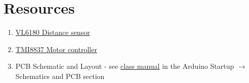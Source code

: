 \section{Resources}\label{sec:distmotorservoresources}
\begin{enumerate}
    \item \href{https://www.st.com/resource/en/datasheet/vl6180.pdf}{VL6180 Distance sensor}
    \item \href{https://datasheet.lcsc.com/lcsc/2001060933_TMI-TMI8837_C478955.pdf}{TMI8837 Motor controller}
    \item PCB Schematic and Layout - see 
            \href{https://github.com/semcneil/Fundamentals-of-Microcontrollers-Manual}{class manual} 
            in the Arduino Startup $\rightarrow$ Schematics and PCB section
\end{enumerate}

